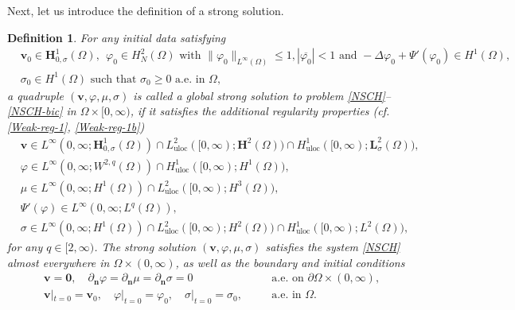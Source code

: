 \documentclass[11pt,reqno]{amsart}
\newtheorem{definition}{\textbf{Definition}}[section]
\def\H{\bm{H}}
\def\L{\bm{L}}
\def\n{{\bm{n}}}
\def\vv{\bm{v}}
\begin{document}
Next, let us introduce the definition of a strong solution.
%
\begin{definition}
\label{def-strong}
For any initial data satisfying
%
\begin{equation}
\label{init-data1}
\begin{split}
&\vv_0 \in \H_{0,\sigma}^1(\Omega),\ \  \varphi_0 \in H_N^2(\Omega) \text{ with } \| \varphi_0\|_{L^\infty(\Omega)}\leq 1,
\left|\overline{\varphi_0} \right|<1  \text{ and } -\Delta \varphi_0 +\Psi'(\varphi_0)\in H^1(\Omega),
\\
& \sigma_0 \in H^1(\Omega) \text{ such that } \sigma_0\geq 0  \text{ a.e. in  } \Omega,
\end{split}
\end{equation}
%
a quadruple $(\bm{v},\varphi,\mu,\sigma)$ is called a \emph{global strong solution} to problem \eqref{NSCH}--\eqref{NSCH-bic} in $\Omega\times [0,\infty)$, if it satisfies the additional regularity properties (cf. \eqref{Weak-reg-1}, \eqref{Weak-reg-1b})
%
\begin{equation}
\label{strong-reg-2}
\begin{split}
&\vv \in L^\infty(0,\infty; \H^1_{0,\sigma}(\Omega))
\cap L^2_{\mathrm{uloc}}([0,\infty); \H^2(\Omega))\cap H^1_{\mathrm{uloc}}([0,\infty); \L_\sigma^2(\Omega)),\\
&\varphi \in L^\infty(0,\infty;W^{2,q}(\Omega))\cap H^1_{\mathrm{uloc}}([0,\infty);H^1(\Omega)),
\\
&\mu \in L^\infty(0,\infty; H^1(\Omega))\cap L^2_{\mathrm{uloc}}([0,\infty);H^3(\Omega)),
\\
&\Psi'(\varphi)\in L^\infty(0,\infty; L^q(\Omega)),
\\
&\sigma \in L^\infty(0,\infty;H^1(\Omega)) \cap L^2_{\mathrm{uloc}}([0,\infty); H^2(\Omega))\cap H^1_{\mathrm{uloc}}([0,\infty);L^2(\Omega)),
\end{split}
\end{equation}
%
for any $q \in [2,\infty)$. The strong solution $(\bm{v},\varphi,\mu,\sigma)$ satisfies the system \eqref{NSCH} almost everywhere in $\Omega \times (0,\infty)$, as well as the boundary and initial conditions
%
\begin{align}
& \vv=\mathbf{0}, \quad \partial_\n \varphi=\partial_\n \mu=\partial_\n \sigma=0 \quad &&\text{a.e. on }  \partial \Omega \times (0,\infty),
\label{boundary-s}\\
& \vv|_{t=0}=\vv_0,\quad \varphi|_{t=0}=\varphi_{0},\quad \sigma|_{t=0}=\sigma_0,\quad &&\textrm{a.e. in  } \Omega.	
\label{ini-s}
\end{align}
\end{definition}
\end{document}
